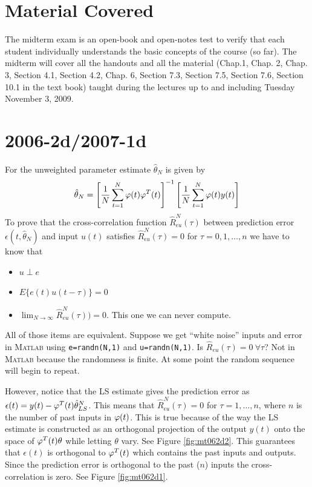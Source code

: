 \documentclass[lecture,12pt,]{pcms-l}
\begin{document}
\mainmatter
\setcounter{page}{1}

\lectureseries[\course]{\course}

\date{November 5, 2009}

\setaddress

\setcounter{lecture}{20}
\setcounter{chapter}{20}


\section{Material Covered}
The midterm exam is an open-book and open-notes test to verify that each student individually understands the basic concepts of the course (so far). The midterm will cover all the handouts and all the material (Chap.1, Chap. 2, Chap. 3,  Section 4.1, Section 4.2, Chap. 6, Section 7.3, Section 7.5, Section 7.6, Section 10.1 in the text book) taught during the lectures up to and including Tuesday November 3, 2009.

\section{2006-2d/2007-1d}
For the unweighted parameter estimate $\hat{\theta}_N$ is given by
$$\hat{\theta}_N = \left[\frac{1}{N}\sum_{t=1}^N\varphi(t)\varphi^T(t)\right]^{-1}\left[\frac{1}{N}\sum_{t=1}^N\varphi(t)y(t)\right]$$
To prove that the cross-correlation function $\hat{R}_{\epsilon u}^N(\tau)$ between prediction error $\epsilon(t,\hat{\theta}_N)$ and input $u(t)$ satisfies $\hat{R}_{\epsilon u}^N(\tau)=0$ for $\tau=0,1,\ldots,n$ we have to know that
\begin{itemize}
\item $u\perp e$
\item $E\{e(t)u(t-\tau)\}=0$
\item $\lim_{N\to\infty}\hat{R}_{eu}^N(\tau))=0$. This one we can never compute.
\end{itemize}
All of those items are equivalent. Suppose we get ``white noise'' inputs and error in \textsc{Matlab} using \texttt{e=randn(N,1)} and \texttt{u=randn(N,1)}. Is $\hat{R}_{eu}(\tau)=0 ~\forall \tau$? Not in \textsc{Matlab} because the randomness is finite. At some point the random sequence will begin to repeat.

However, notice that the LS estimate gives the prediction error as $\epsilon(t)=y(t)-\varphi^T(t)\hat{\theta}_{LS}^N$. This means that $\hat{R}_{\epsilon u}^N(\tau)=0$ for $\tau=1,\ldots,n$, where $n$ is the number of past inputs in $\varphi(t)$. This is true because of the way the LS estimate is constructed as an orthogonal projection of the output $y(t)$ onto the space of $\varphi^T(t)\theta$ while letting $\theta$ vary. See Figure \ref{fig:mt062d2}. This guarantees that $\epsilon(t)$ is orthogonal to $\varphi^T(t)$ which contains the past inputs and outputs. Since the prediction error is orthogonal to the past ($n$) inputs the cross-correlation is zero. See Figure \ref{fig:mt062d1}.
\end{document}
